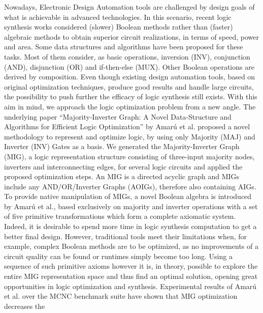 \documentclass[
	accentcolor=1c,%
	type=intern,
	marginpar=false,
	ruledheaders=section,
	class=report,
	BCOR=5mm,
      parskip=half-,
	fontsize=10pt
	]{tudapub}
\begin{document}
	Nowadays, Electronic Design Automation tools are challenged by design goals of what is
	achievable in advanced technologies. In this scenario, recent logic synthesis works considered
	(slower) Boolean methods rather than (faster) algebraic methods to obtain superior circuit
	realizations, in terms of speed, power and area. Some data structures and algorithms have been
	proposed for these tasks. Most of them consider, as basic operations, inversion (INV),
	conjunction (AND), disjunction (OR) and if-then-else (MUX). Other Boolean operations are derived
	by composition.
	\newline
	\newline
	Even though existing design automation tools, based on original optimization
	techniques, produce good results and handle large circuits, the possibility to push further the
	efficacy of logic synthesis still exists. With this aim in mind, we approach the logic optimization problem from
	a new angle. The underlying paper
	``Majority-Inverter Graph: A Novel Data-Structure and Algorithms for Efficient Logic Optimization''
	by Amarú et al. proposed a novel methodology to represent and optimize logic, by using
	only Majority (MAJ) and Inverter (INV) Gates as a basis. We generated the Majority-Inverter
	Graph (MIG), a logic representation structure consisting of three-input majority nodes, inverters and interconnecting edges, for several logic circuits
	and applied the proposed optimization steps.
	\newline
	\newline
	An MIG is a directed acyclic graph and MIGs include any AND/OR/Inverter Graphs (AOIGs),
	therefore also containing AIGs. To provide native manipulation of MIGs, a novel Boolean algebra is introduced by Amarú et al.,
	based exclusively on majority and inverter operations with a set of five primitive
	transformations which form a complete axiomatic system. Indeed, it is desirable to spend more time in logic
	synthesis computation to get a better final design. However, traditional tools meet their limitations when,
	for example, complex Boolean methods are to be optimized, as no improvements of a circuit quality can be found or
	runtimes simply become too long. Using a sequence of such primitive axioms however it is, in theory, possible to
	explore the entire MIG representation space and thus find an optimal solution, opening great opportunities
	in logic optimization and synthesis.
	\newline
	\newline
	Experimental results of Amarú et al. over the MCNC benchmark suite have shown that MIG optimization decreases the
\end{document}
